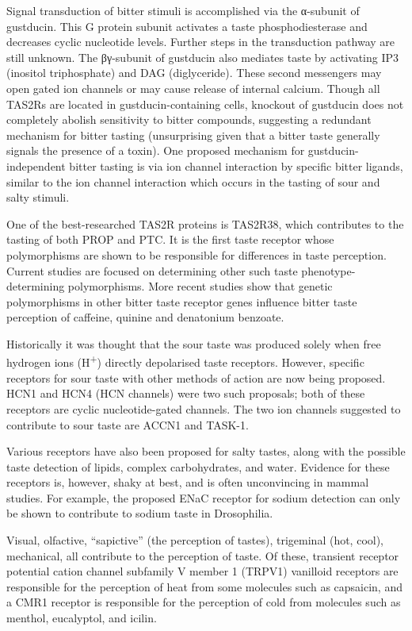 Signal transduction of bitter stimuli is accomplished via the α-subunit of gustducin. This G protein subunit activates a taste phosphodiesterase and decreases cyclic nucleotide levels. Further steps in the transduction pathway are still unknown. The βγ-subunit of gustducin also mediates taste by activating IP3 (inositol triphosphate) and DAG (diglyceride). These second messengers may open gated ion channels or may cause release of internal calcium. Though all TAS2Rs are located in gustducin-containing cells, knockout of gustducin does not completely abolish sensitivity to bitter compounds, suggesting a redundant mechanism for bitter tasting (unsurprising given that a bitter taste generally signals the presence of a toxin). One proposed mechanism for gustducin-independent bitter tasting is via ion channel interaction by specific bitter ligands, similar to the ion channel interaction which occurs in the tasting of sour and salty stimuli.

One of the best-researched TAS2R proteins is TAS2R38, which contributes to the tasting of both PROP and PTC. It is the first taste receptor whose polymorphisms are shown to be responsible for differences in taste perception. Current studies are focused on determining other such taste phenotype-determining polymorphisms. More recent studies show that genetic polymorphisms in other bitter taste receptor genes influence bitter taste perception of caffeine, quinine and denatonium benzoate.

Historically it was thought that the sour taste was produced solely when free hydrogen ions (H\textsuperscript{+}) directly depolarised taste receptors. However, specific receptors for sour taste with other methods of action are now being proposed. HCN1 and HCN4 (HCN channels) were two such proposals; both of these receptors are cyclic nucleotide-gated channels. The two ion channels suggested to contribute to sour taste are ACCN1 and TASK-1.

Various receptors have also been proposed for salty tastes, along with the possible taste detection of lipids, complex carbohydrates, and water. Evidence for these receptors is, however, shaky at best, and is often unconvincing in mammal studies. For example, the proposed ENaC receptor for sodium detection can only be shown to contribute to sodium taste in Drosophilia.

Visual, olfactive, ``sapictive'' (the perception of tastes), trigeminal (hot, cool), mechanical, all contribute to the perception of taste. Of these, transient receptor potential cation channel subfamily V member 1 (TRPV1) vanilloid receptors are responsible for the perception of heat from some molecules such as capsaicin, and a CMR1 receptor is responsible for the perception of cold from molecules such as menthol, eucalyptol, and icilin.

